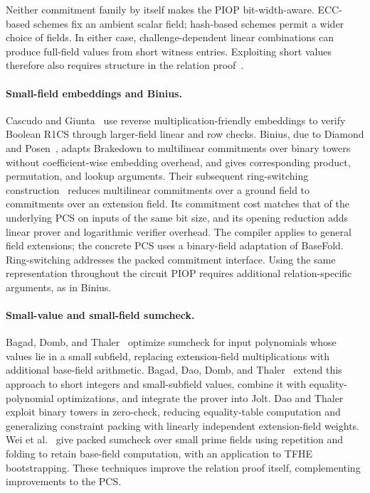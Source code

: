 Neither commitment family by itself makes the PIOP bit-width-aware.
ECC-based schemes fix an ambient scalar field; hash-based schemes
permit a wider choice of fields. In either case, challenge-dependent
linear combinations can produce full-field values from short
witness entries. Exploiting short values therefore also requires
structure in the relation proof~\cite{iacr/BagadDDT25}.

\paragraph{Small-field embeddings and Binius.}
Cascudo and Giunta~\cite{iacr/CascudoG21} use reverse
multiplication-friendly embeddings to verify Boolean R1CS through
larger-field linear and row checks.
Binius, due to Diamond and Posen~\cite{eurocrypt/DiamondP25},
adapts Brakedown to multilinear commitments over binary towers
without coefficient-wise embedding overhead, and gives corresponding
product, permutation, and lookup arguments.
Their subsequent ring-switching construction~\cite{eurocrypt/DiamondP26}
reduces multilinear commitments over a ground field to commitments
over an extension field. Its commitment cost matches that of the
underlying PCS on inputs of the same bit size, and its opening
reduction adds linear prover and logarithmic verifier overhead.
The compiler applies to general field extensions; the concrete PCS
uses a binary-field adaptation of BaseFold.
Ring-switching addresses the packed commitment interface.
Using the same representation throughout the circuit PIOP requires
additional relation-specific arguments, as in Binius.

\paragraph{Small-value and small-field sumcheck.}
Bagad, Domb, and Thaler~\cite{iacr/BagadDT24} optimize sumcheck
for input polynomials whose values lie in a small subfield, replacing
extension-field multiplications with additional base-field arithmetic.
Bagad, Dao, Domb, and Thaler~\cite{iacr/BagadDDT25} extend this
approach to short integers and small-subfield values, combine it
with equality-polynomial optimizations, and integrate the prover
into Jolt.
Dao and Thaler~\cite{iacr/DaoT24} exploit binary towers in
zero-check, reducing equality-table computation and generalizing
constraint packing with linearly independent extension-field weights.
Wei et al.~\cite{iacr/WeiWXZDWZ25} give packed sumcheck over small
prime fields using repetition and folding to retain base-field
computation, with an application to TFHE bootstrapping.
These techniques improve the relation proof itself, complementing
improvements to the PCS.

